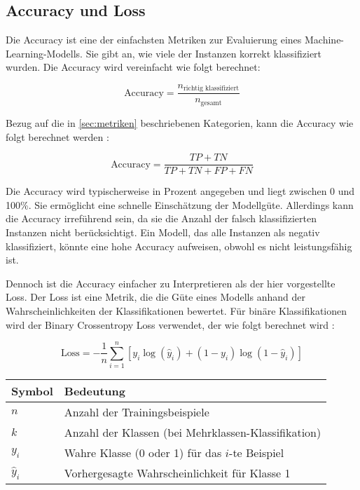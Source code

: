 \subsection{Accuracy und Loss} \label{sec:accuracy}

Die Accuracy ist eine der einfachsten Metriken zur Evaluierung eines Machine-Learning-Modells. Sie gibt an, wie viele der Instanzen korrekt klassifiziert wurden. Die Accuracy wird vereinfacht wie folgt berechnet:

\begin{equation}
    \text{Accuracy} = \frac{n_{\text{richtig klassifiziert}}}{n_{\text{gesamt}}}
\end{equation}

Bezug auf die in \autoref{sec:metriken} beschriebenen Kategorien, kann die Accuracy wie folgt berechnet werden \cite{ai_wiki_accuracy_2019}:

\begin{equation}
    \text{Accuracy} = \frac{TP + TN}{TP + TN + FP + FN} 
\end{equation}

Die Accuracy wird typischerweise in Prozent angegeben und liegt zwischen 0 und 100\%. Sie ermöglicht eine schnelle Einschätzung der Modellgüte. Allerdings kann die Accuracy irreführend sein, da sie die Anzahl der falsch klassifizierten Instanzen nicht berücksichtigt. Ein Modell, das alle Instanzen als negativ klassifiziert, könnte eine hohe Accuracy aufweisen, obwohl es nicht leistungsfähig ist.

Dennoch ist die Accuracy einfacher zu Interpretieren als der hier vorgestellte Loss. Der Loss ist eine Metrik, die die Güte eines Modells anhand der Wahrscheinlichkeiten der Klassifikationen bewertet. 
Für binäre Klassifikationen wird der Binary Crossentropy Loss verwendet, der wie folgt berechnet wird 
\cite{ai_wiki_accuracy_2019}:

\begin{equation}
    \text{Loss} = -\frac{1}{n} \sum_{i=1}^{n} \left[ y_i \log(\hat{y}_i) + (1 - y_i) \log(1 - \hat{y}_i) \right]
    \label{eq:binary_crossentropy}
\end{equation}

\begin{tabular}{ll}
    \hline
    \textbf{Symbol} & \textbf{Bedeutung} \\
    \hline
    $n$ & Anzahl der Trainingsbeispiele \\
    $k$ & Anzahl der Klassen (bei Mehrklassen-Klassifikation) \\
    $y_i$ & Wahre Klasse (0 oder 1) für das $i$-te Beispiel \\
    $\hat{y}_i$ & Vorhergesagte Wahrscheinlichkeit für Klasse 1 \\
    \hline
\end{tabular}

